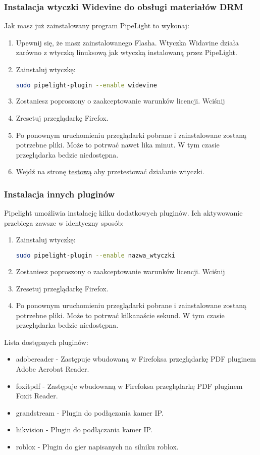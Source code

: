 \subsubsection{Instalacja wtyczki Widevine do obsługi materiałów DRM}
\noindent Jak masz już zainstalowany program PipeLight to wykonaj:
\begin{enumerate}
\item Upewnij się, że masz zainstalowanego Flasha. Wtyczka Widavine działa zarówno z wtyczką linuksową jak wtyczką instalowaną przez PipeLight.
\item Zainstaluj wtyczkę:
\begin{lstlisting}[language=bash]
sudo pipelight-plugin --enable widevine
\end{lstlisting}
\item Zostaniesz poproszony o zaakceptowanie warunków licencji. Wciśnij 
\item Zresetuj przeglądarkę Firefox.
\item Po ponownym uruchomieniu przeglądarki pobrane i zainstalowane zostaną potrzebne pliki. Może to potrwać nawet lika minut. W tym czasie przeglądarka bedzie niedostępna.
\item Wejdź na stronę \href{http://www.widevine.com/demo/index.html}{testową} aby przetestować działanie wtyczki.
\end{enumerate}

\subsubsection{Instalacja innych pluginów}
\noindent Pipelight umożliwia instalację kilku dodatkowych pluginów. Ich aktywowanie przebiega zawsze w identyczny sposób:
\begin{enumerate}
\item Zainstaluj wtyczkę:
\begin{lstlisting}[language=bash]
sudo pipelight-plugin --enable nazwa_wtyczki
\end{lstlisting}
\item Zostaniesz poproszony o zaakceptowanie warunków licencji. Wciśnij 
\item Zresetuj przeglądarkę Firefox.
\item Po ponownym uruchomieniu przeglądarki pobrane i zainstalowane zostaną potrzebne pliki. Może to potrwać kilkanaście sekund. W tym czasie przeglądarka bedzie niedostępna.
\end{enumerate}
Lista dostępnych pluginów:
\begin{itemize}
\item \textcolor{ubuntu_orange}{adobereader} - Zastępuje wbudowaną w Firefoksa przeglądarkę PDF pluginem Adobe Acrobat Reader.
\item \textcolor{ubuntu_orange}{foxitpdf} - Zastępuje wbudowaną w Firefoksa przeglądarkę PDF pluginem Foxit Reader.
\item \textcolor{ubuntu_orange}{grandstream} - Plugin do podłączania kamer IP.
\item \textcolor{ubuntu_orange}{hikvision} - Plugin do podłączania kamer IP.
\item \textcolor{ubuntu_orange}{roblox} - Plugin do gier napisanych na silniku roblox.
\end{itemize}


